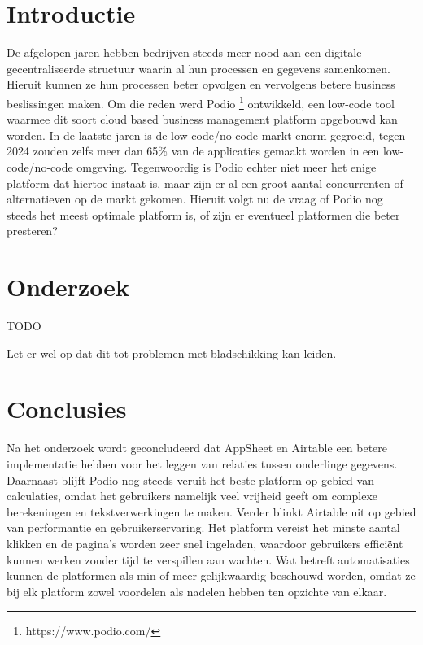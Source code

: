 \documentclass[a0,portrait]{hogent-poster}
\begin{document}
\begin{multicols}{2} %

\section{Introductie}

De afgelopen jaren hebben bedrijven steeds meer nood aan een digitale gecentraliseerde structuur waarin al hun processen en gegevens samenkomen. Hieruit kunnen ze hun processen beter opvolgen en vervolgens betere business beslissingen maken. Om die reden werd Podio \footnote{https://www.podio.com/} ontwikkeld, een low-code tool waarmee dit soort cloud based business management platform opgebouwd kan worden. In de laatste jaren is de low-code/no-code markt enorm gegroeid, tegen 2024 zouden zelfs meer dan 65\% van de applicaties gemaakt worden in een low-code/no-code omgeving. Tegenwoordig is Podio echter niet meer het enige platform dat hiertoe instaat is, maar zijn er al een groot aantal concurrenten of alternatieven op de markt gekomen. Hieruit volgt nu de vraag of Podio nog steeds het meest optimale platform is, of zijn er eventueel platformen die beter presteren? \\

\section{Onderzoek}

TODO


Let er wel op dat dit tot problemen met bladschikking kan leiden.

\section{Conclusies}

Na het onderzoek wordt geconcludeerd dat AppSheet en Airtable een betere implementatie hebben voor het leggen van relaties tussen onderlinge gegevens. Daarnaast blijft Podio nog steeds veruit het beste platform op gebied van calculaties, omdat het gebruikers namelijk veel vrijheid geeft om complexe berekeningen en tekstverwerkingen te maken. Verder blinkt Airtable uit op gebied van performantie en gebruikerservaring. Het platform vereist het minste aantal klikken en de pagina's worden zeer snel ingeladen, waardoor gebruikers efficiënt kunnen werken zonder tijd te verspillen aan wachten. Wat betreft automatisaties kunnen de platformen als min of meer gelijkwaardig beschouwd worden, omdat ze bij elk platform zowel voordelen als nadelen hebben ten opzichte van elkaar. \\


\end{multicols}
\end{document}
